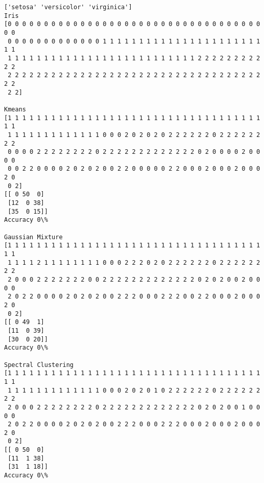 \documentclass[11pt]{article}
\begin{document}
    \begin{Verbatim}[commandchars=\\\{\}]
['setosa' 'versicolor' 'virginica']
Iris
[0 0 0 0 0 0 0 0 0 0 0 0 0 0 0 0 0 0 0 0 0 0 0 0 0 0 0 0 0 0 0 0 0 0 0 0 0
 0 0 0 0 0 0 0 0 0 0 0 0 0 1 1 1 1 1 1 1 1 1 1 1 1 1 1 1 1 1 1 1 1 1 1 1 1
 1 1 1 1 1 1 1 1 1 1 1 1 1 1 1 1 1 1 1 1 1 1 1 1 1 1 2 2 2 2 2 2 2 2 2 2 2
 2 2 2 2 2 2 2 2 2 2 2 2 2 2 2 2 2 2 2 2 2 2 2 2 2 2 2 2 2 2 2 2 2 2 2 2 2
 2 2]

Kmeans
[1 1 1 1 1 1 1 1 1 1 1 1 1 1 1 1 1 1 1 1 1 1 1 1 1 1 1 1 1 1 1 1 1 1 1 1 1
 1 1 1 1 1 1 1 1 1 1 1 1 1 0 0 0 2 0 2 0 2 0 2 2 2 2 2 2 0 2 2 2 2 2 2 2 2
 0 0 0 0 2 2 2 2 2 2 2 2 0 2 2 2 2 2 2 2 2 2 2 2 2 2 0 2 0 0 0 0 2 0 0 0 0
 0 0 2 2 0 0 0 0 2 0 2 0 2 0 0 2 2 0 0 0 0 0 2 2 0 0 0 2 0 0 0 2 0 0 0 2 0
 0 2]
[[ 0 50  0]
 [12  0 38]
 [35  0 15]]
Accuracy 0\%

Gaussian Mixture
[1 1 1 1 1 1 1 1 1 1 1 1 1 1 1 1 1 1 1 1 1 1 1 1 1 1 1 1 1 1 1 1 1 1 1 1 1
 1 1 1 1 2 1 1 1 1 1 1 1 1 0 0 0 2 2 2 0 2 0 2 2 2 2 2 2 0 2 2 2 2 2 2 2 2
 2 0 0 0 2 2 2 2 2 2 2 0 0 2 2 2 2 2 2 2 2 2 2 2 2 2 0 2 0 2 0 0 2 0 0 0 0
 2 0 2 2 0 0 0 0 2 0 2 0 2 0 0 2 2 2 0 0 0 2 2 2 0 0 2 2 0 0 0 2 0 0 0 2 0
 0 2]
[[ 0 49  1]
 [11  0 39]
 [30  0 20]]
Accuracy 0\%

Spectral Clustering
[1 1 1 1 1 1 1 1 1 1 1 1 1 1 1 1 1 1 1 1 1 1 1 1 1 1 1 1 1 1 1 1 1 1 1 1 1
 1 1 1 1 1 1 1 1 1 1 1 1 1 0 0 0 2 0 2 0 1 0 2 2 2 2 2 2 0 2 2 2 2 2 2 2 2
 2 0 0 0 2 2 2 2 2 2 2 2 0 2 2 2 2 2 2 2 2 2 2 2 2 2 0 2 0 2 0 0 1 0 0 0 0
 2 0 2 2 0 0 0 0 2 0 2 0 2 0 0 2 2 2 0 0 0 2 2 2 0 0 0 2 0 0 0 2 0 0 0 2 0
 0 2]
[[ 0 50  0]
 [11  1 38]
 [31  1 18]]
Accuracy 0\%

    \end{Verbatim}

    \begin{center}
    \end{center}
    { \hspace*{\fill} \\}
    
\end{document}
